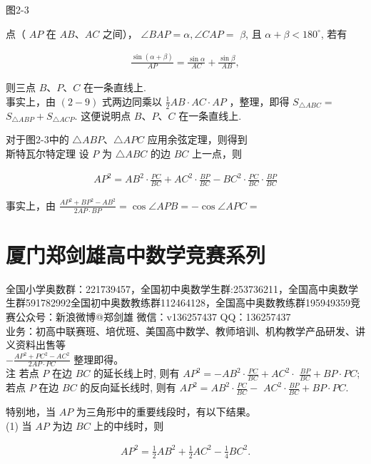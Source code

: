 \documentclass[10pt]{article}
\begin{document}
图2-3

点（ $A P$ 在 $A B 、 A C$ 之间）， $\angle B A P=\alpha, \angle C A P=$ $\beta$, 且 $\alpha+\beta<180^{\circ}$, 若有

\begin{align*}
\frac{\sin (\alpha+\beta)}{A P}=\frac{\sin \alpha}{A C}+\frac{\sin \beta}{A B},
\end{align*}

则三点 $B 、 P 、 C$ 在一条直线上.\\
事实上，由 $(2-9)$ 式两边同乘以 $\frac{1}{2} A B \cdot A C \cdot A P$ ，整理，即得 $S_{\triangle A B C}=$ $S_{\triangle A B P}+S_{\triangle A C P}$. 这便说明点 $B 、 P 、 C$ 在一条直线上.

对于图2-3中的 $\triangle A B P 、 \triangle A P C$ 应用余弦定理，则得到\\
斯特瓦尔特定理 设 $P$ 为 $\triangle A B C$ 的边 $B C$ 上一点，则

\begin{align*}
A P^{2}=A B^{2} \cdot \frac{P C}{B C}+A C^{2} \cdot \frac{B P}{B C}-B C^{2} \cdot \frac{P C}{B C} \cdot \frac{B P}{B C} \tag{2-10}
\end{align*}

事实上，由 $\frac{A P^{2}+B P^{2}-A B^{2}}{2 A P \cdot B P}=\cos \angle A P B=-\cos \angle A P C=$

\section*{厦门郑剑雄高中数学竞赛系列}
全国小学奥数群：221739457，全国初中奥数学生群:253736211，全国高中奥数学生群591782992全国初中奥数教练群112464128，全国高中奥数教练群195949359竞赛公众号：新浪微博@郑剑雄 微信：v136257437 QQ：136257437\\
业务：初高中联赛班、培优班、美国高中数学、教师培训、机构教学产品研发、讲义资料出售等\\
$-\frac{A P^{2}+P C^{2}-A C^{2}}{2 A P \cdot P C}$ 整理即得。\\
注 若点 $P$ 在边 $B C$ 的延长线上时, 则有 $A P^{2}=-A B^{2} \cdot \frac{P C}{B C}+A C^{2} \cdot$ $\frac{B P}{B C}+B P \cdot P C$; 若点 $P$ 在边 $B C$ 的反向延长线时, 则有 $A P^{2}=A B^{2} \cdot \frac{P C}{B C}-$ $A C^{2} \cdot \frac{B P}{B C}+B P \cdot P C$.

特别地，当 $A P$ 为三角形中的重要线段时，有以下结果。\\
(1) 当 $A P$ 为边 $B C$ 上的中线时，则

\begin{align*}
A P^{2}=\frac{1}{2} A B^{2}+\frac{1}{2} A C^{2}-\frac{1}{4} B C^{2} . \tag{2-11}
\end{align*}
\end{document}

